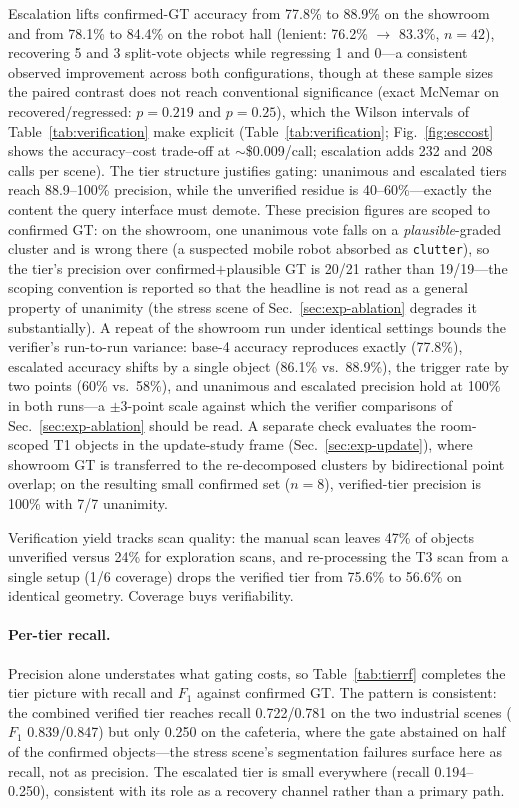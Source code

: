 Escalation lifts confirmed-GT accuracy from 77.8\% to 88.9\% on the showroom
and from 78.1\% to 84.4\% on the robot hall (lenient: 76.2\%
$\rightarrow$ 83.3\%, $n{=}42$), recovering 5 and 3 split-vote objects while
regressing 1 and 0---a consistent observed improvement across both
configurations, though at these sample sizes the paired contrast does not
reach conventional significance (exact McNemar on recovered/regressed:
$p{=}0.219$ and $p{=}0.25$), which the Wilson intervals of
Table~\ref{tab:verification} make explicit (Table~\ref{tab:verification};
Fig.~\ref{fig:esccost} shows the accuracy--cost trade-off at
$\sim$\$0.009/call; escalation adds 232 and 208 calls per scene). The tier
structure
justifies gating: unanimous and escalated tiers reach 88.9--100\% precision,
while the unverified residue is 40--60\%---exactly the content the query
interface must demote. These precision figures are scoped to confirmed
GT: on the showroom, one unanimous vote falls on a \emph{plausible}-graded
cluster and is wrong there (a suspected mobile robot absorbed as
\texttt{clutter}), so the tier's precision over confirmed$+$plausible GT is
20/21 rather than 19/19---the scoping convention is reported so that the
headline is not read as a general property of unanimity (the stress scene
of Sec.~\ref{sec:exp-ablation} degrades it substantially). A repeat of the showroom run under identical
settings bounds the verifier's run-to-run variance: base-4 accuracy
reproduces exactly (77.8\%), escalated accuracy shifts by a single object
(86.1\% vs.\ 88.9\%), the trigger rate by two points (60\% vs.\ 58\%), and
unanimous and escalated precision hold at 100\% in both runs---a
$\pm$3-point scale against which the verifier comparisons of
Sec.~\ref{sec:exp-ablation} should be read. A separate check evaluates the room-scoped T1 objects
in the update-study frame (Sec.~\ref{sec:exp-update}), where showroom GT is
transferred to the re-decomposed clusters by bidirectional point overlap;
on the resulting small confirmed set ($n{=}8$), verified-tier precision is
100\% with 7/7 unanimity.

Verification yield tracks scan quality: the manual scan leaves 47\% of
objects unverified versus 24\% for exploration scans, and re-processing the
T3 scan from a single setup (1/6 coverage) drops the verified tier from
75.6\% to 56.6\% on identical geometry. Coverage buys verifiability.

\paragraph{Per-tier recall.}
Precision alone understates what gating costs, so
Table~\ref{tab:tierrf} completes the tier picture with recall and $F_1$
against confirmed GT. The pattern is consistent: the combined verified
tier reaches recall 0.722/0.781 on the two industrial scenes
($F_1$ 0.839/0.847) but only 0.250 on the cafeteria, where the gate
abstained on half of the confirmed objects---the stress scene's
segmentation failures surface here as recall, not as precision. The
escalated tier is small everywhere (recall 0.194--0.250), consistent
with its role as a recovery channel rather than a primary path.

